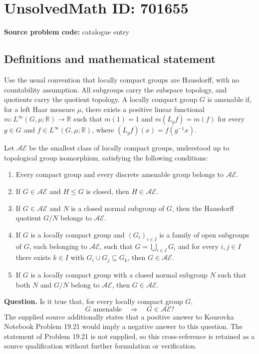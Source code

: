 \documentclass[11pt]{article}
\newcommand{\R}{\mathbb{R}}
\begin{document}
\section*{UnsolvedMath ID: 701655}
\textbf{Source problem code:} catalogue entry
\subsection{Definitions and mathematical statement}
Use the usual convention that locally compact groups are Hausdorff, with no countability assumption. All subgroups carry the subspace topology, and quotients carry the quotient topology. A locally compact group \(G\) is amenable if, for a left Haar measure \(\mu\), there exists a positive linear functional \(m:L^\infty(G,\mu;\R)\to\R\) such that \(m(1)=1\) and \(m(L_gf)=m(f)\) for every \(g\in G\) and \(f\in L^\infty(G,\mu;\R)\), where \((L_gf)(x)=f(g^{-1}x)\).

Let \(\mathscr{AE}\) be the smallest class of locally compact groups, understood up to topological group isomorphism, satisfying the following conditions:
\begin{enumerate}
\item Every compact group and every discrete amenable group belongs to \(\mathscr{AE}\).
\item If \(G\in\mathscr{AE}\) and \(H\leq G\) is closed, then \(H\in\mathscr{AE}\).
\item If \(G\in\mathscr{AE}\) and \(N\) is a closed normal subgroup of \(G\), then the Hausdorff quotient \(G/N\) belongs to \(\mathscr{AE}\).
\item If \(G\) is a locally compact group and \((G_i)_{i\in I}\) is a family of open subgroups of \(G\), each belonging to \(\mathscr{AE}\), such that \(G=\bigcup_{i\in I}G_i\) and for every \(i,j\in I\) there exists \(k\in I\) with \(G_i\cup G_j\subseteq G_k\), then \(G\in\mathscr{AE}\).
\item If \(G\) is a locally compact group with a closed normal subgroup \(N\) such that both \(N\) and \(G/N\) belong to \(\mathscr{AE}\), then \(G\in\mathscr{AE}\).
\end{enumerate}
\textbf{Question.} Is it true that, for every locally compact group \(G\),
\[
G\text{ amenable}\quad\Longrightarrow\quad G\in\mathscr{AE}?
\]
The supplied source additionally states that a positive answer to Kourovka Notebook Problem 19.21 would imply a negative answer to this question. The statement of Problem 19.21 is not supplied, so this cross-reference is retained as a source qualification without further formulation or verification.
\end{document}
